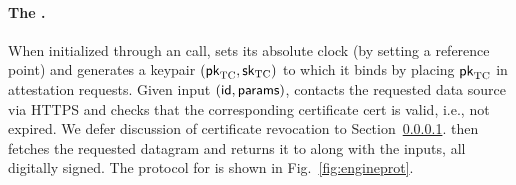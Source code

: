 \paragraph{The \encname \engine.} When initialized through an \initcall call, \engine sets its absolute clock (by setting a reference point) and generates a keypair $({\sf pk}_{\textrm{TC}},{\sf sk}_{\textrm{TC}})$ to which it binds by placing ${\sf pk}_{\textrm{TC}}$ in attestation requests. Given input \resumecall $({\sf id}, {\sf params})$, \engine contacts the requested data source via HTTPS and checks that the corresponding certificate {\sf cert} is valid, i.e., not expired. We defer discussion of certificate revocation to Section~\ref{}. \engine then fetches the requested datagram and returns it to \relay along with the inputs, all digitally signed. The protocol for \engine is shown in Fig.~\ref{fig:engineprot}.

